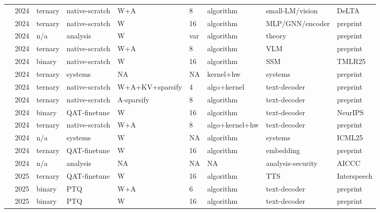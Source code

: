 \begin{landscape}
\begin{longtable}{p{3.2cm} p{1cm} p{1.9cm} p{2.2cm} p{2.2cm} p{1.3cm} p{2.2cm} p{2.1cm} p{2.5cm}}
\citet{Nielsen2024-Reloaded} & 2024 & ternary & native-scratch & W+\allowbreak{}A & 8 & algorithm & small-LM/\allowbreak{}vision & De\allowbreak{}LTA \\
\citet{Nielsen2024-WhenEnough} & 2024 & ternary & native-scratch & W & 16 & algorithm & MLP/\allowbreak{}GNN/\allowbreak{}encoder & preprint \\
\citet{Ouyang2024-QiDScaling} & 2024 & n/\allowbreak{}a & analysis & W & var & algorithm & theory & preprint \\
\citet{Sundaram2024-LLaVaOLMoBitnet} & 2024 & ternary & native-scratch & W+\allowbreak{}A & 8 & algorithm & VLM & preprint \\
\citet{Tang2024-BiMamba} & 2024 & binary & native-scratch & W & 16 & algorithm & SSM & TMLR25 \\
\citet{Wang2024-1bitAIInfra} & 2024 & ternary & systems & NA & NA & kernel+\allowbreak{}hw & systems & preprint \\
\citet{Wang2024-BitNetA48} & 2024 & ternary & native-scratch & W+\allowbreak{}A+\allowbreak{}KV+\allowbreak{}sparsify & 4 & algo+\allowbreak{}kernel & text-decoder & preprint \\
\citet{Wang2024-QSparse} & 2024 & ternary & native-scratch & A-sparsify & 8 & algorithm & text-decoder & preprint \\
\citet{Xu2024-OneBit} & 2024 & binary & QAT-finetune & W & 16 & algorithm & text-decoder & Neur\allowbreak{}IPS \\
\citet{Zhu2024-MatmulFree} & 2024 & ternary & native-scratch & W+\allowbreak{}A & 8 & algo+\allowbreak{}kernel+\allowbreak{}hw & text-decoder & preprint \\
\citet{Dehghankar2024-EfficientMatmul} & 2024 & n/\allowbreak{}a & systems & W & NA & algorithm & systems & ICML25 \\
\citet{Chen2024-TernaryEmbedding} & 2024 & ternary & QAT-finetune & W & 16 & algorithm & embedding & preprint \\
\citet{Fan2024-ResilientEfficient} & 2024 & n/\allowbreak{}a & analysis & NA & NA & NA & analysis-security & AICCC \\
\citet{Kawamura2025-BitTTS} & 2025 & ternary & QAT-finetune & W & 16 & algorithm & TTS & Interspeech \\
\citet{Ye2025-DBellQuant} & 2025 & binary & PTQ & W+\allowbreak{}A & 6 & algorithm & text-decoder & preprint \\
\citet{Hoang2025-OutputAlign1bit} & 2025 & binary & PTQ & W & 16 & algorithm & text-decoder & preprint \\

\end{longtable}
\end{landscape}
